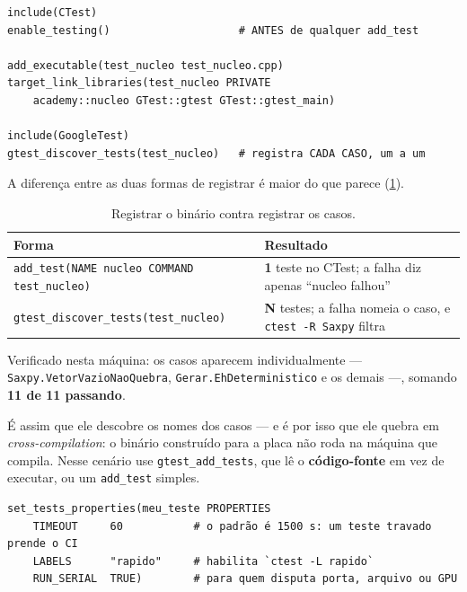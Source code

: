 \begin{lstlisting}[style=bt, language=Meson,
    morekeywords={include,enable_testing,add_executable,target_link_libraries,
                  gtest_discover_tests,add_test,PRIVATE,NAME,COMMAND},
    caption={O registro dos testes, resumo de \texttt{src/cmake/CMakeLists.txt}, seção 8.}]
include(CTest)
enable_testing()                    # ANTES de qualquer add_test

add_executable(test_nucleo test_nucleo.cpp)
target_link_libraries(test_nucleo PRIVATE
    academy::nucleo GTest::gtest GTest::gtest_main)

include(GoogleTest)
gtest_discover_tests(test_nucleo)   # registra CADA CASO, um a um
\end{lstlisting}

A diferença entre as duas formas de registrar é maior do que parece
(\cref{tab:ctest-registro}).

\begin{table}[htbp]
\centering
\caption{Registrar o binário contra registrar os casos.}
\label{tab:ctest-registro}
\footnotesize
\begin{tabular}{@{}p{}p{}@{}}
\toprule
\textbf{Forma} & \textbf{Resultado} \\
\midrule
\texttt{add\_test(NAME nucleo COMMAND test\_nucleo)} &
\textbf{1} teste no CTest; a falha diz apenas ``nucleo falhou'' \\
\texttt{gtest\_discover\_tests(test\_nucleo)} &
\textbf{N} testes; a falha nomeia o caso, e \texttt{ctest -R Saxpy} filtra \\
\bottomrule
\end{tabular}
\end{table}

Verificado nesta máquina: os casos aparecem individualmente ---
\texttt{Saxpy.VetorVazioNaoQuebra}, \texttt{Gerar.EhDeterministico} e os demais
---, somando \textbf{11 de 11 passando}.

\begin{armadilha}
É assim que ele descobre os nomes dos casos --- e é por isso que ele quebra em
\emph{cross-compilation}: o binário construído para a placa não roda na máquina
que compila. Nesse cenário use \texttt{gtest\_add\_tests}, que lê o
\textbf{código-fonte} em vez de executar, ou um \texttt{add\_test} simples.
\end{armadilha}

\begin{lstlisting}[style=bt, language=Meson,
    morekeywords={set_tests_properties,PROPERTIES,TIMEOUT,LABELS,RUN_SERIAL},
    caption={As três propriedades de teste que mais importam.}]
set_tests_properties(meu_teste PROPERTIES
    TIMEOUT     60           # o padrão é 1500 s: um teste travado prende o CI
    LABELS      "rapido"     # habilita `ctest -L rapido`
    RUN_SERIAL  TRUE)        # para quem disputa porta, arquivo ou GPU
\end{lstlisting}

